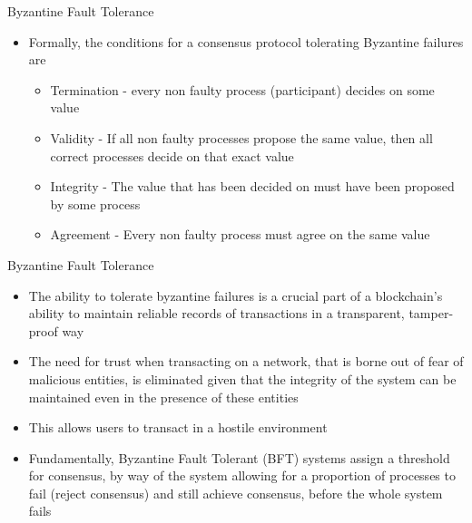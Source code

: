\documentclass[11pt]{beamer}
\begin{document}
\begin{frame}{Byzantine Fault Tolerance}
	\begin{itemize}
		\item Formally, the conditions for a consensus protocol tolerating Byzantine failures are
		\begin{itemize}
			\item Termination - every non faulty process (participant) decides on some value
			\item Validity - If all non faulty processes propose the same value, then all correct processes decide on that exact value
			\item Integrity - The value that has been decided on must have been proposed by some process
			\item Agreement - Every non faulty process must agree on the same value
		\end{itemize}
	\end{itemize}
\end{frame}


\begin{frame}{Byzantine Fault Tolerance}
	\begin{itemize}
		\item The ability to tolerate byzantine failures is a crucial part of a blockchain's ability to maintain reliable records of transactions in a transparent, tamper-proof way
		\item The need for trust when transacting on a network, that is borne out of fear of malicious entities, is eliminated given that the integrity of the system can be maintained even in the presence of these entities
		\item This allows users to transact in a hostile environment
		\item Fundamentally, Byzantine Fault Tolerant (BFT) systems assign a threshold for consensus, by way of the system allowing for a proportion of processes to fail (reject consensus) and still achieve consensus, before the whole system fails
	\end{itemize}
\end{frame}

\end{document}
